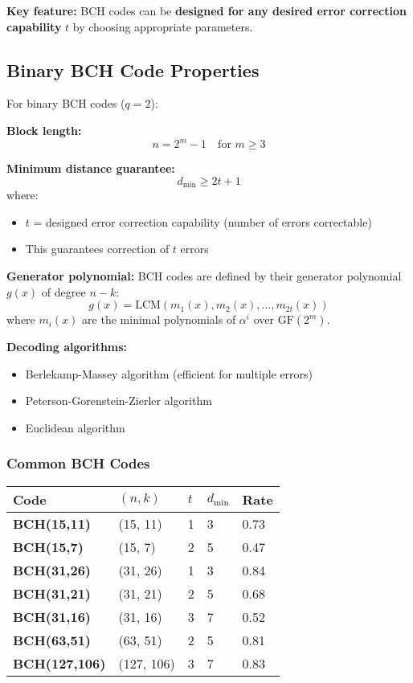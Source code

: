 \textbf{Key feature:} BCH codes can be \textbf{designed for any desired error correction capability} $t$ by choosing appropriate parameters.

\subsection{Binary BCH Code Properties}

For binary BCH codes ($q = 2$):

\textbf{Block length:}
\begin{equation}
n = 2^m - 1 \quad \text{for } m \geq 3
\end{equation}

\textbf{Minimum distance guarantee:}
\begin{equation}
d_{\min} \geq 2t + 1
\end{equation}
where:
\begin{itemize}
\item $t$ = designed error correction capability (number of errors correctable)
\item This guarantees correction of $t$ errors
\end{itemize}

\textbf{Generator polynomial:} BCH codes are defined by their generator polynomial $g(x)$ of degree $n-k$:
\begin{equation}
g(x) = \mathrm{LCM}(m_1(x), m_2(x), \ldots, m_{2t}(x))
\end{equation}
where $m_i(x)$ are the minimal polynomials of $\alpha^i$ over $\mathrm{GF}(2^m)$.

\textbf{Decoding algorithms:}
\begin{itemize}
\item Berlekamp-Massey algorithm (efficient for multiple errors)
\item Peterson-Gorenstein-Zierler algorithm
\item Euclidean algorithm
\end{itemize}

\subsubsection{Common BCH Codes}\label{common-bch-codes}

{\def\LTcaptype{} %
\begin{longtable}[]{@{}lllll@{}}
\toprule\noalign{}
Code & \((n, k)\) & \(t\) & \(d_{\min}\) & Rate \\
\midrule\noalign{}
\endhead
\bottomrule\noalign{}
\endlastfoot
\textbf{BCH(15,11)} & (15, 11) & 1 & 3 & 0.73 \\
\textbf{BCH(15,7)} & (15, 7) & 2 & 5 & 0.47 \\
\textbf{BCH(31,26)} & (31, 26) & 1 & 3 & 0.84 \\
\textbf{BCH(31,21)} & (31, 21) & 2 & 5 & 0.68 \\
\textbf{BCH(31,16)} & (31, 16) & 3 & 7 & 0.52 \\
\textbf{BCH(63,51)} & (63, 51) & 2 & 5 & 0.81 \\
\textbf{BCH(127,106)} & (127, 106) & 3 & 7 & 0.83 \\
\end{longtable}
}


